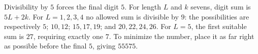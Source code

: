 Divisibility by $5$ forces the final digit $5$. For length $L$ and $k$ sevens, digit sum is $5L+2k$. For $L=1,2,3,4$ no allowed sum is divisible by $9$: the possibilities are respectively $5$; $10,12$; $15,17,19$; and $20,22,24,26$. For $L=5$, the first suitable sum is $27$, requiring exactly one $7$. To minimize the number, place it as far right as possible before the final $5$, giving $\boxed{55575}$.
